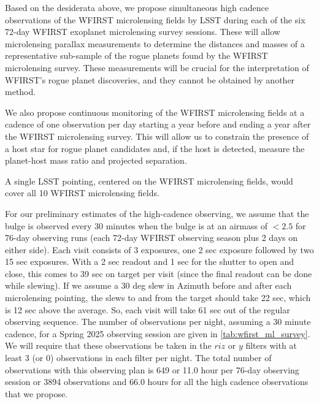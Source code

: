 Based on the desiderata above, we
propose simultaneous high cadence observations of the WFIRST microlensing fields
by LSST during each
of the six 72-day WFIRST exoplanet microlensing survey sessions. These
will allow microlensing parallax measurements to determine the distances
and masses of a representative sub-sample of the rogue planets found by
the WFIRST microlensing survey. These measurements will be crucial for
the interpretation of WFIRST's rogue planet discoveries, and they
cannot be obtained by another method.

We also propose continuous monitoring of the WFIRST microlensing fields
at a cadence of one observation per day
starting a year before and ending a year after the WFIRST microlensing survey.
This will allow us to constrain the presence of a host star for rogue planet candidates and,
if the host is detected, measure the planet-host mass ratio and projected separation.

A single LSST pointing, centered on the WFIRST microlensing
fields, would cover all 10 WFIRST microlensing fields.

For our preliminary estimates of the high-cadence observing, we assume
that the bulge is observed every 30 minutes when the bulge is at
an airmass of $< 2.5$ for 76-day observing runs (each 72-day WFIRST observing
season plus 2 days on either side). Each visit consists of 3 exposures,
one 2 sec exposure followed by two 15 sec exposures. With a 2 sec readout
and 1 sec for the shutter to open and close, this comes to 39 sec on target
per visit (since the final readout can be done while slewing).
If we assume a 30 deg slew in Azimuth before and after each microlensing pointing, the slews
to and from the target should take 22 sec, which is 12 sec above the average. So,
each visit will take 61 sec out of the regular observing sequence.
The number of observations per night, assuming a 30 minute cadence, for
a Spring 2025 observing session are given in \autoref{tab:wfirst_ml_survey}. We will require
that these observations be taken in the $riz$ or $y$ filters with at
least 3 (or 0) observations in each filter per night. The total number
of observations with this observing plan is 649 or 11.0 hour per
76-day observing session or 3894 observations and 66.0 hours for
all the high cadence observations that we propose.

